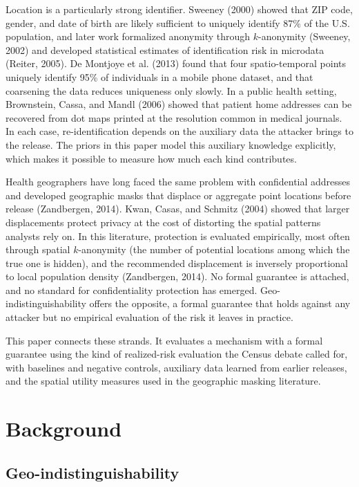 \documentclass[11pt]{article}
\begin{document}
Location is a particularly strong identifier. Sweeney (2000) showed that ZIP code, gender, and date of birth are likely sufficient to uniquely identify 87\% of the U.S. population, and later work formalized anonymity through $k$-anonymity (Sweeney, 2002) and developed statistical estimates of identification risk in microdata (Reiter, 2005). De Montjoye et al. (2013) found that four spatio-temporal points uniquely identify 95\% of individuals in a mobile phone dataset, and that coarsening the data reduces uniqueness only slowly. In a public health setting, Brownstein, Cassa, and Mandl (2006) showed that patient home addresses can be recovered from dot maps printed at the resolution common in medical journals. In each case, re-identification depends on the auxiliary data the attacker brings to the release. The priors in this paper model this auxiliary knowledge explicitly, which makes it possible to measure how much each kind contributes.

Health geographers have long faced the same problem with confidential addresses and developed geographic masks that displace or aggregate point locations before release (Zandbergen, 2014). Kwan, Casas, and Schmitz (2004) showed that larger displacements protect privacy at the cost of distorting the spatial patterns analysts rely on. In this literature, protection is evaluated empirically, most often through spatial $k$-anonymity (the number of potential locations among which the true one is hidden), and the recommended displacement is inversely proportional to local population density (Zandbergen, 2014). No formal guarantee is attached, and no standard for confidentiality protection has emerged. Geo-indistinguishability offers the opposite, a formal guarantee that holds against any attacker but no empirical evaluation of the risk it leaves in practice.

This paper connects these strands. It evaluates a mechanism with a formal guarantee using the kind of realized-risk evaluation the Census debate called for, with baselines and negative controls, auxiliary data learned from earlier releases, and the spatial utility measures used in the geographic masking literature.

\section{Background}

\subsection{Geo-indistinguishability}
\end{document}
